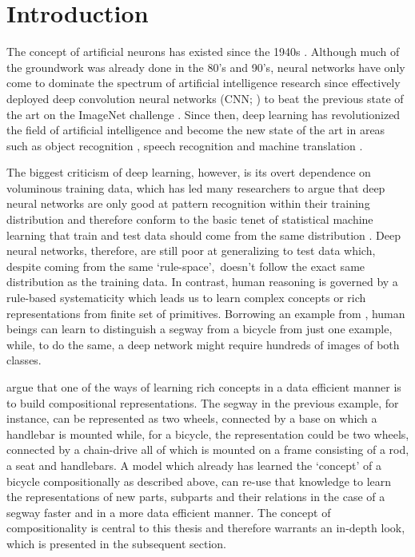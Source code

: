 \chapter{Introduction}\label{Chpater:intro}
	
The concept of artificial neurons has existed since the 1940s \citep{McCulloch1943}. Although much of the groundwork was already done in the 80's and 90's, neural networks have only come to dominate the spectrum of artificial intelligence research since \cite{Krizhevsky2012} effectively deployed deep convolution neural networks (CNN; \citep{Lecun89}) to beat the previous state of the art on the ImageNet challenge \citep{Deng2009}. Since then, deep learning has revolutionized the field of artificial intelligence and become the new state of the art in areas such as object recognition \citep{He2015}, speech recognition \citep{Graves2013} and machine translation \citep{Sutskever2014}.

The biggest criticism of deep learning, however, is its overt dependence on voluminous training data, which has led many researchers to argue that deep neural networks are only good at pattern recognition within their training distribution \citep{Marcus2018} and therefore conform to the basic tenet of statistical machine learning that train and test data should come from the same distribution \citep{Zadrozny:2004:LEC:1015330.1015425}. Deep neural networks, therefore, are still poor at generalizing to test data which, despite coming from the same \lq rule-space{}\rq,\ doesn't follow the exact same distribution as the training data. In contrast, human reasoning is governed by a rule-based systematicity \citep{FODOR19883} which leads us to learn complex concepts or rich representations from finite set of primitives. Borrowing an example from \cite{Lake2016}, human beings can learn to distinguish a segway from a bicycle from just one example, while, to do the same, a deep network might require hundreds of images of both classes. 

\cite{Lake2016} argue that one of the ways of learning rich concepts in a data efficient manner is to build compositional representations. The segway in the previous example, for instance, can be represented as two wheels, connected by a base on which a handlebar is mounted while, for a bicycle, the representation could be two wheels, connected by a chain-drive all of which is mounted on a frame consisting of a rod, a seat and handlebars. A model which already has learned the \lq concept\rq{} of a bicycle compositionally as described above, can re-use that knowledge to learn the representations of new parts, subparts and their relations in the case of a segway faster and in a more data efficient manner. The concept of compositionality is central to this thesis and therefore warrants an in-depth look, which is presented in the subsequent section.

